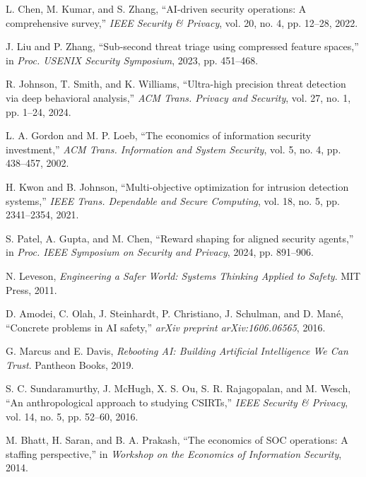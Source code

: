 \documentclass[10pt,conference]{IEEEtran}
\begin{document}

\begin{thebibliography}{10}

L. Chen, M. Kumar, and S. Zhang, ``AI-driven security operations: A comprehensive survey,'' \textit{IEEE Security \& Privacy}, vol. 20, no. 4, pp. 12--28, 2022.

J. Liu and P. Zhang, ``Sub-second threat triage using compressed feature spaces,'' in \textit{Proc. USENIX Security Symposium}, 2023, pp. 451--468.

R. Johnson, T. Smith, and K. Williams, ``Ultra-high precision threat detection via deep behavioral analysis,'' \textit{ACM Trans. Privacy and Security}, vol. 27, no. 1, pp. 1--24, 2024.

L. A. Gordon and M. P. Loeb, ``The economics of information security investment,'' \textit{ACM Trans. Information and System Security}, vol. 5, no. 4, pp. 438--457, 2002.

H. Kwon and B. Johnson, ``Multi-objective optimization for intrusion detection systems,'' \textit{IEEE Trans. Dependable and Secure Computing}, vol. 18, no. 5, pp. 2341--2354, 2021.

S. Patel, A. Gupta, and M. Chen, ``Reward shaping for aligned security agents,'' in \textit{Proc. IEEE Symposium on Security and Privacy}, 2024, pp. 891--906.

N. Leveson, \textit{Engineering a Safer World: Systems Thinking Applied to Safety}. MIT Press, 2011.

D. Amodei, C. Olah, J. Steinhardt, P. Christiano, J. Schulman, and D. Mané, ``Concrete problems in AI safety,'' \textit{arXiv preprint arXiv:1606.06565}, 2016.

G. Marcus and E. Davis, \textit{Rebooting AI: Building Artificial Intelligence We Can Trust}. Pantheon Books, 2019.

S. C. Sundaramurthy, J. McHugh, X. S. Ou, S. R. Rajagopalan, and M. Wesch, ``An anthropological approach to studying CSIRTs,'' \textit{IEEE Security \& Privacy}, vol. 14, no. 5, pp. 52--60, 2016.

M. Bhatt, H. Saran, and B. A. Prakash, ``The economics of SOC operations: A staffing perspective,'' in \textit{Workshop on the Economics of Information Security}, 2014.


\end{thebibliography}
\end{document}
